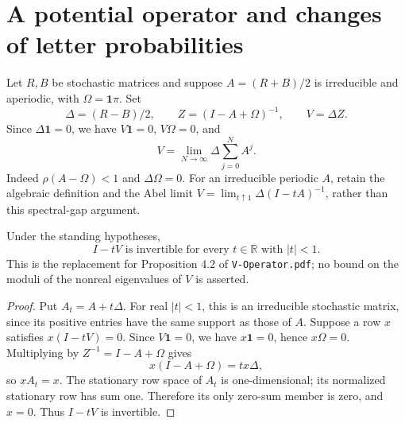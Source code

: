 \section{A potential operator and changes of letter probabilities}
\label{potential:section}

Let $R,B$ be stochastic matrices and suppose $A=(R+B)/2$ is irreducible
and aperiodic, with $\Omega=\mathbf1\pi$. Set
\[
 \Delta=(R-B)/2,\qquad Z=(I-A+\Omega)^{-1},\qquad V=\Delta Z.
\]
Since $\Delta\mathbf1=0$, we have $V\mathbf1=0$, $V\Omega=0$, and
\[
 V=\lim_{N\to\infty}\Delta\sum_{j=0}^N A^j.
\]
Indeed $\rho(A-\Omega)<1$ and $\Delta\Omega=0$. For an irreducible
periodic $A$, retain the algebraic definition and the Abel limit
$V=\lim_{t\uparrow1}\Delta(I-tA)^{-1}$, rather than this spectral-gap argument.

\begin{proposition}\label{potential:real-invertibility}
Under the standing hypotheses,
\[
 I-tV\text{ is invertible for every }t\in\mathbb R\text{ with }|t|<1.
\]
This is the replacement for Proposition 4.2 of \texttt{V-Operator.pdf};
no bound on the moduli of the nonreal eigenvalues of $V$ is asserted.
\end{proposition}
\begin{proof}
Put $A_t=A+t\Delta$. For real $|t|<1$, this is an irreducible stochastic
matrix, since its positive entries have the same support as those of $A$.
Suppose a row $x$ satisfies $x(I-tV)=0$. Since $V\mathbf1=0$,
we have $x\mathbf1=0$, hence $x\Omega=0$. Multiplying by
$Z^{-1}=I-A+\Omega$ gives
\[
 x(I-A+\Omega)=t x\Delta,
\]
so $xA_t=x$. The stationary row space of $A_t$ is one-dimensional;
its normalized stationary row has sum one. Therefore its only zero-sum
member is zero, and $x=0$. Thus $I-tV$ is invertible.
\end{proof}


